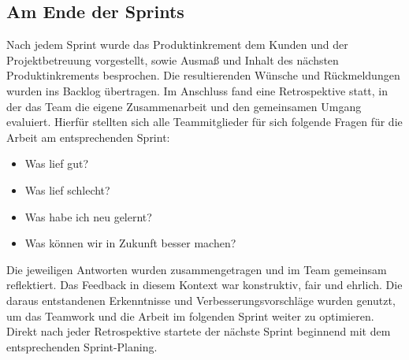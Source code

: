 \documentclass[10pt, a4paper]{article}
\begin{document}
\begin{onehalfspace}
  \subsection{Am Ende der Sprints}
  Nach jedem Sprint wurde das Produktinkrement dem Kunden und der Projektbetreuung vorgestellt, sowie Ausmaß und Inhalt des nächsten Produktinkrements besprochen.
  Die resultierenden Wünsche und Rückmeldungen wurden ins Backlog übertragen.
  Im Anschluss fand eine Retrospektive statt,
  in der das Team die eigene Zusammenarbeit und den gemeinsamen Umgang evaluiert.
  Hierfür stellten sich alle Teammitglieder für sich folgende Fragen für die Arbeit am entsprechenden Sprint:
  \begin{itemize}[noitemsep,topsep=0pt,parsep=0pt,partopsep=0pt]
    \item Was lief gut?
    \item Was lief schlecht?
    \item Was habe ich neu gelernt?
    \item Was können wir in Zukunft besser machen?
  \end{itemize}
  Die jeweiligen Antworten wurden zusammengetragen und im Team gemeinsam reflektiert.
  Das Feedback in diesem Kontext war konstruktiv, fair und ehrlich.
  Die daraus entstandenen Erkenntnisse und Verbesserungsvorschläge wurden genutzt, um das Teamwork und die Arbeit im folgenden Sprint weiter zu optimieren.
  Direkt nach jeder Retrospektive startete der nächste Sprint beginnend mit dem entsprechenden Sprint-Planing.


\end{onehalfspace}
\end{document}
